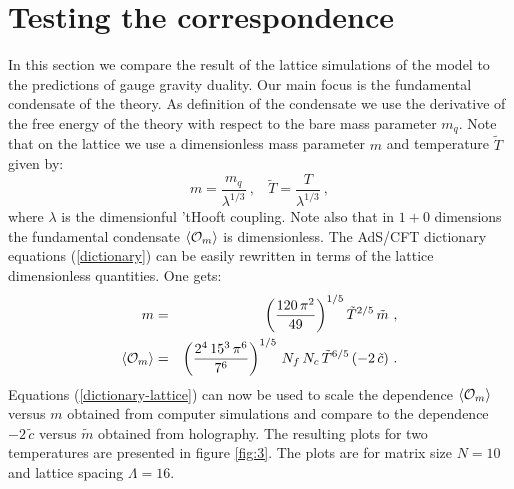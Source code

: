 \documentclass[a4paper]{jpconf}
\begin{document}
%

\section{Testing the correspondence}
\label{section test}
In this section we compare the result of the lattice simulations of the model to the predictions of gauge gravity duality. Our main focus is the fundamental condensate of the theory. As definition of the condensate we use the derivative of the free energy of the theory with respect to the bare mass parameter $m_q$.    Note that on the lattice we use a dimensionless mass parameter $m$ and temperature $\tilde T$ given by:
%
\begin{equation}
m = \frac{m_q}{\lambda^{1/3}}\ ,~~~~\tilde T = \frac{T}{\lambda^{1/3}}\ ,
\end{equation}
%
where $\lambda$ is the dimensionful 'tHooft coupling. Note also that in $1+0$ dimensions the fundamental condensate $\langle {\cal O}_m\rangle$ is dimensionless. The AdS/CFT dictionary equations (\ref{dictionary}) can be easily rewritten in terms of the lattice dimensionless quantities. One gets:
%
\begin{eqnarray}
m &=& \left(\frac{120\,\pi^2}{49}\right)^{1/5}\tilde{T}^{2/5}\,\tilde m\ , \nonumber \\
\langle {\cal O}_m\rangle &=&\left(\frac{2^4 \,15^3\,\pi^6}{7^6}\right)^{1/5}\,N_f\,N_c\,\tilde T^{6/5}\,(-2\,\tilde c)\ .
\label{dictionary-lattice}
\end{eqnarray}
%
 Equations (\ref{dictionary-lattice}) can now be used to scale the dependence $\langle {\cal O}_m\rangle$ versus $m$ obtained from computer simulations and compare to the dependence $-2\,\tilde c$ versus $\tilde m$ obtained from holography. The resulting plots for two temperatures are presented in figure \ref{fig:3}. The plots are for matrix size $N=10$ and lattice spacing $\Lambda = 16$.
\end{document}
